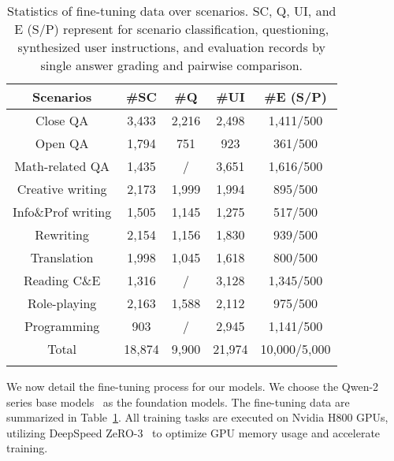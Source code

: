 \begin{table}[t]
  \small
  \centering
  \caption{Statistics of fine-tuning data over scenarios. SC, Q, UI, and E (S/P) represent for scenario classification, questioning, synthesized user instructions, and evaluation records by single answer grading and pairwise comparison.} %
  \label{tab:finetuning-data}
  \begin{tabular}{c c c c c}
    \toprule
    \textbf{Scenarios} & \textbf{\#SC} & \textbf{\#Q} & \textbf{\#UI}  & \textbf{\#E (S/P)}  \\ \midrule
        Close QA & 3,433 & 2,216 & 2,498 & 1,411/500 \\
        Open QA & 1,794 & 751 & 923 & 361/500 \\
        Math-related QA & 1,435 & / & 3,651 & 1,616/500 \\
        Creative writing & 2,173 & 1,999 & 1,994 & 895/500 \\
        Info\&Prof writing & 1,505 & 1,145 & 1,275 & 517/500 \\
        Rewriting & 2,154 & 1,156 & 1,830 & 939/500 \\
        Translation & 1,998 & 1,045 & 1,618 & 800/500 \\
        Reading C\&E & 1,316 & / & 3,128 & 1,345/500 \\
        Role-playing & 2,163 & 1,588 & 2,112 & 975/500 \\
        Programming & 903 & / & 2,945 & 1,141/500 \\ \midrule
        Total & 18,874 & 9,900 & 21,974 & 10,000/5,000 \\
    \bottomrule \\
  \end{tabular}
\end{table}



We now detail the fine-tuning process for our models. We choose the Qwen-2 series base models~\cite{qwen} as the foundation models. The fine-tuning data are summarized in Table~\ref{tab:finetuning-data}. All training tasks are executed on Nvidia H800 GPUs, utilizing DeepSpeed ZeRO-3~\cite{deepspeed} to optimize GPU memory usage and accelerate training.



